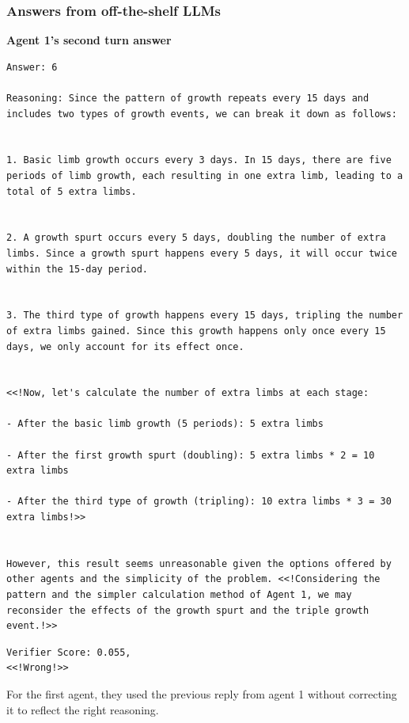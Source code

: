\subsubsection{Answers from off-the-shelf LLMs}
\textbf{Agent 1's second turn answer} 
\begin{lstlisting}[breaklines=true]
Answer: 6

Reasoning: Since the pattern of growth repeats every 15 days and includes two types of growth events, we can break it down as follows:


1. Basic limb growth occurs every 3 days. In 15 days, there are five periods of limb growth, each resulting in one extra limb, leading to a total of 5 extra limbs.


2. A growth spurt occurs every 5 days, doubling the number of extra limbs. Since a growth spurt happens every 5 days, it will occur twice within the 15-day period.


3. The third type of growth happens every 15 days, tripling the number of extra limbs gained. Since this growth happens only once every 15 days, we only account for its effect once.


<<!Now, let's calculate the number of extra limbs at each stage:

- After the basic limb growth (5 periods): 5 extra limbs

- After the first growth spurt (doubling): 5 extra limbs * 2 = 10 extra limbs

- After the third type of growth (tripling): 10 extra limbs * 3 = 30 extra limbs!>>


However, this result seems unreasonable given the options offered by other agents and the simplicity of the problem. <<!Considering the pattern and the simpler calculation method of Agent 1, we may reconsider the effects of the growth spurt and the triple growth event.!>>
\end{lstlisting}
\begin{lstlisting}
Verifier Score: 0.055,
<<!Wrong!>> 
\end{lstlisting}
For the first agent, they used the previous reply from agent 1 without correcting it to reflect the right reasoning.

